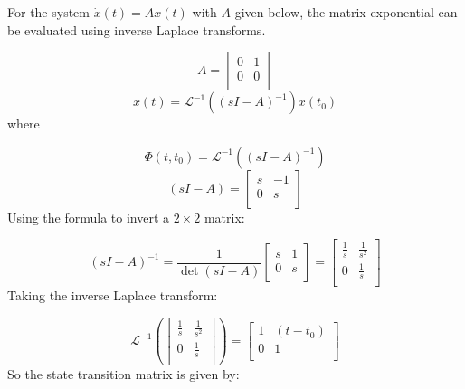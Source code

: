 \begin{example}
  For the system $\dot{x}(t)=Ax(t)$ with $A$ given below, the matrix exponential can be evaluated using inverse Laplace transforms.

  \begin{equation*}
    A=
    \left[
      \begin{array}{cc}
        0 & 1 \\
        0 & 0 \\
      \end{array}
    \right]
  \end{equation*}
  \begin{equation*}
    x(t)=\mathscr{L}^{-1}((sI-A)^{-1})x(t_{0})
  \end{equation*}
  where

  \begin{equation*}
    \Phi(t,t_{0})=\mathscr{L}^{-1}((sI-A)^{-1})
  \end{equation*}
  \begin{equation*}
    (sI-A)=
    \left[
      \begin{array}{cc}
        s & -1 \\
        0 & s \\
      \end{array}
    \right]
  \end{equation*}
  Using the formula to invert a $2\times2$ matrix:

  \begin{equation*}
    (sI-A)^{-1}=\frac{1}{\det(sI-A)}
    \left[
      \begin{array}{cc}
        s & 1 \\
        0 & s \\
      \end{array}
    \right]=
    \left[
      \begin{array}{cc}
        \frac{1}{s} & \frac{1}{s^{2}} \\
        0 & \frac{1}{s} \\
      \end{array}
    \right]
  \end{equation*}
  Taking the inverse Laplace transform:

  \begin{equation*}
    \mathscr{L}^{-1}
    \left(\left[
      \begin{array}{cc}
        \frac{1}{s} & \frac{1}{s^{2}} \\
        0 & \frac{1}{s} \\
      \end{array}
    \right]\right)=
    \left[
      \begin{array}{cc}
        1 & (t-t_{0}) \\
        0 & 1 \\
      \end{array}
    \right]
  \end{equation*}
  So the state transition matrix is given by:


\end{example}
